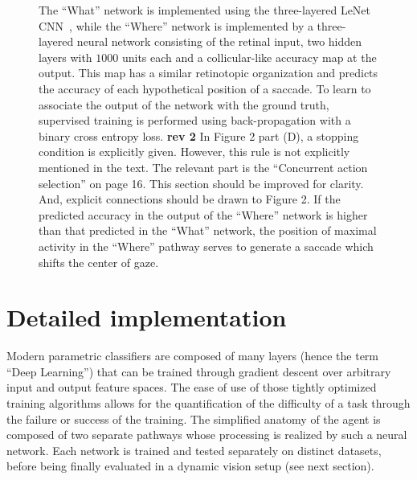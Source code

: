\begin{figure}[t!]
{		The ``What'' network is implemented using the three-layered LeNet CNN~\cite{Lecun1998}, while the ``Where'' network is implemented by a three-layered neural network consisting of the retinal input, two hidden layers with $1000$ units each and a collicular-like accuracy map at the output.  This map has a similar retinotopic organization and predicts the accuracy of each hypothetical position of a saccade. %
		To learn to associate the output of the network with the ground truth, supervised training is performed using back-propagation with a binary cross entropy loss. 
		\D 
		{\color{red} \textbf{rev 2} In Figure 2 part (D), a stopping condition is explicitly given. However, this rule is not explicitly mentioned in the text. The relevant part is the “Concurrent action selection” on page 16. This section should be improved for clarity. And, explicit connections should be drawn to Figure 2.}
		If the predicted accuracy in the output of the ``Where'' network is higher than that predicted in the ``What'' network, the position of maximal activity in the ``Where'' pathway serves to generate a saccade which shifts the center of gaze. %
		\label{fig:methods}}%
\end{figure}%

\section*{Detailed implementation}
\label{sec:implementation}

Modern parametric classifiers are composed of many layers (hence the term ``Deep Learning'') that can be trained through gradient descent over arbitrary input and output feature spaces. The ease of use of those tightly optimized training algorithms allows for the quantification of the difficulty of a task through the failure or success of the training.
The simplified anatomy of the agent is composed of two separate pathways whose processing is realized by such a neural network. Each network is trained and tested separately on distinct datasets, before being finally evaluated in a dynamic vision setup (see next section). 


